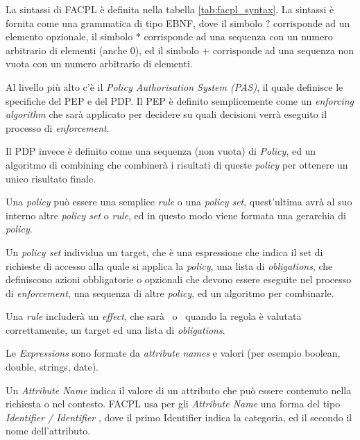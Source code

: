 La sintassi di FACPL è definita nella tabella \ref{tab:facpl_syntax}.
La sintassi è fornita come una grammatica di tipo EBNF, dove il simbolo ? corrisponde ad un elemento opzionale, il simbolo $*$ corrisponde ad una sequenza con un numero arbitrario di elementi (anche $0$), ed il simbolo $+$ corrisponde ad una sequenza non vuota con un numero arbitrario di elementi.\\ \par
Al livello più alto c'è il \textit{Policy Authorisation System (PAS)}, il quale definisce le specifiche del PEP e del PDP. Il PEP è definito semplicemente come un \textit{enforcing algorithm} che sarà applicato per decidere su quali decisioni verrà eseguito il processo di \textit{enforcement}. \\ \par
Il PDP invece è definito come una sequenza (non vuota) di \textit{Policy}, ed un algoritmo di combining che combinerà i risultati di queste \textit{policy} per ottenere un unico risultato finale.\\ \par
Una \textit{policy} può essere una semplice \textit{rule} o una \textit{policy set}, quest'ultima avrà al suo interno altre \textit{policy set} o \textit{rule}, ed in questo modo viene formata una gerarchia di \textit{policy}.\\ \par
Un \textit{policy set} individua un target, che è una espressione che indica il set di richieste di accesso alla quale si applica la \textit{policy}, una lista di \textit{obligations}, che definiscono azioni obbligatorie o opzionali che devono essere eseguite nel processo di \textit{enforcement}, una sequenza di altre \textit{policy}, ed un algoritmo per combinarle.\\ \par
Una \textit{rule} includerà un \textit{effect}, che sarà \permit \ o \deny \ quando la regola è valutata correttamente, un target ed una lista di \textit{obligations}.\\ \par
Le \textit{Expressions} sono formate da \textit{attribute names} e valori (per esempio boolean, double, strings, date).\\ \par
Un \textit{Attribute Name} indica il valore di un attributo che può essere contenuto nella richiesta o nel contesto. FACPL usa per gli \textit{Attribute Name} una forma del tipo \textit{Identifier / Identifier }, dove il primo Identifier indica la categoria, ed il secondo il nome dell'attributo.
